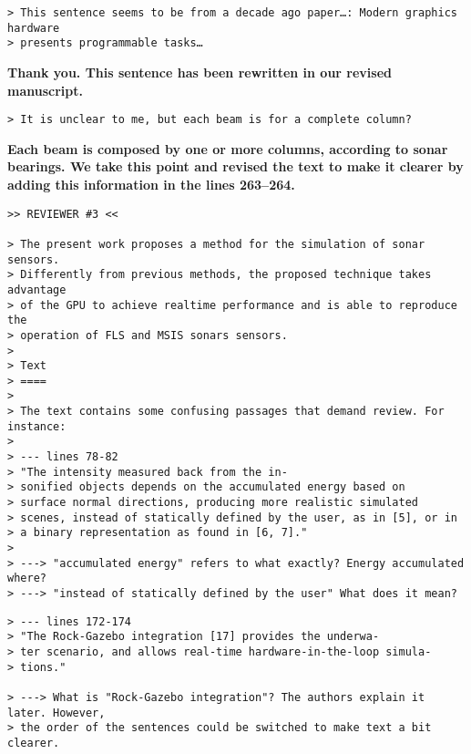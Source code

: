 \documentclass{article}
\begin{document}

\begin{verbatim}
> This sentence seems to be from a decade ago paper…: Modern graphics hardware
> presents programmable tasks…
\end{verbatim}

\textbf{Thank you. This sentence has been rewritten in our revised manuscript.}

\begin{verbatim}
> It is unclear to me, but each beam is for a complete column?
\end{verbatim}

\textbf{Each beam is composed by one or more columns, according to sonar
bearings. We take this point and revised the text to make it clearer by
adding this information in the lines 263--264.}

\begin{verbatim}
>> REVIEWER #3 <<

> The present work proposes a method for the simulation of sonar sensors.
> Differently from previous methods, the proposed technique takes advantage
> of the GPU to achieve realtime performance and is able to reproduce the
> operation of FLS and MSIS sonars sensors.
>
> Text
> ====
>
> The text contains some confusing passages that demand review. For instance:
>
> --- lines 78-82
> "The intensity measured back from the in-
> sonified objects depends on the accumulated energy based on
> surface normal directions, producing more realistic simulated
> scenes, instead of statically defined by the user, as in [5], or in
> a binary representation as found in [6, 7]."
>
> ---> "accumulated energy" refers to what exactly? Energy accumulated where?
> ---> "instead of statically defined by the user" What does it mean?
\end{verbatim}


\begin{verbatim}
> --- lines 172-174
> "The Rock-Gazebo integration [17] provides the underwa-
> ter scenario, and allows real-time hardware-in-the-loop simula-
> tions."

> ---> What is "Rock-Gazebo integration"? The authors explain it later. However,
> the order of the sentences could be switched to make text a bit clearer.
\end{verbatim}
\end{document}
